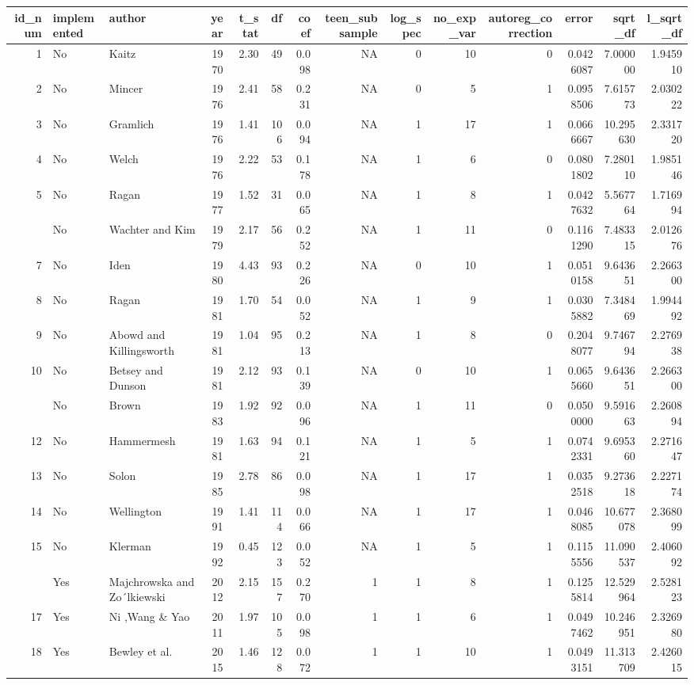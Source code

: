 \documentclass[
]{article}
\begin{document}
\begin{table}
\centering\begingroup\fontsize{11}{13}\selectfont

\begin{tabular}{rllrrrrrrrrrrr}
\toprule
id\_num & implemented & author & year & t\_stat & df & coef & teen\_subsample & log\_spec & no\_exp\_var & autoreg\_correction & error & sqrt\_df & l\_sqrt\_df\\
\midrule
1 & No & Kaitz & 1970 & 2.30 & 49 & 0.098 & NA & 0 & 10 & 0 & 0.0426087 & 7.000000 & 1.945910\\
2 & No & Mincer & 1976 & 2.41 & 58 & 0.231 & NA & 0 & 5 & 1 & 0.0958506 & 7.615773 & 2.030222\\
3 & No & Gramlich & 1976 & 1.41 & 106 & 0.094 & NA & 1 & 17 & 1 & 0.0666667 & 10.295630 & 2.331720\\
4 & No & Welch & 1976 & 2.22 & 53 & 0.178 & NA & 1 & 6 & 0 & 0.0801802 & 7.280110 & 1.985146\\
5 & No & Ragan & 1977 & 1.52 & 31 & 0.065 & NA & 1 & 8 & 1 & 0.0427632 & 5.567764 & 1.716994\\
\addlinespace
6 & No & Wachter and Kim & 1979 & 2.17 & 56 & 0.252 & NA & 1 & 11 & 0 & 0.1161290 & 7.483315 & 2.012676\\
7 & No & Iden & 1980 & 4.43 & 93 & 0.226 & NA & 0 & 10 & 1 & 0.0510158 & 9.643651 & 2.266300\\
8 & No & Ragan & 1981 & 1.70 & 54 & 0.052 & NA & 1 & 9 & 1 & 0.0305882 & 7.348469 & 1.994492\\
9 & No & Abowd and Killingsworth & 1981 & 1.04 & 95 & 0.213 & NA & 1 & 8 & 0 & 0.2048077 & 9.746794 & 2.276938\\
10 & No & Betsey and Dunson & 1981 & 2.12 & 93 & 0.139 & NA & 0 & 10 & 1 & 0.0655660 & 9.643651 & 2.266300\\
\addlinespace
11 & No & Brown & 1983 & 1.92 & 92 & 0.096 & NA & 1 & 11 & 0 & 0.0500000 & 9.591663 & 2.260894\\
12 & No & Hammermesh & 1981 & 1.63 & 94 & 0.121 & NA & 1 & 5 & 1 & 0.0742331 & 9.695360 & 2.271647\\
13 & No & Solon & 1985 & 2.78 & 86 & 0.098 & NA & 1 & 17 & 1 & 0.0352518 & 9.273618 & 2.227174\\
14 & No & Wellington & 1991 & 1.41 & 114 & 0.066 & NA & 1 & 17 & 1 & 0.0468085 & 10.677078 & 2.368099\\
15 & No & Klerman & 1992 & 0.45 & 123 & 0.052 & NA & 1 & 5 & 1 & 0.1155556 & 11.090537 & 2.406092\\
\addlinespace
16 & Yes & Majchrowska and Zo´lkiewski & 2012 & 2.15 & 157 & 0.270 & 1 & 1 & 8 & 1 & 0.1255814 & 12.529964 & 2.528123\\
17 & Yes & Ni ,Wang \& Yao & 2011 & 1.97 & 105 & 0.098 & 1 & 1 & 6 & 1 & 0.0497462 & 10.246951 & 2.326980\\
18 & Yes & Bewley et al. & 2015 & 1.46 & 128 & 0.072 & 1 & 1 & 10 & 1 & 0.0493151 & 11.313709 & 2.426015\\
\bottomrule
\end{tabular}
\endgroup{}
\end{table}
\end{document}

